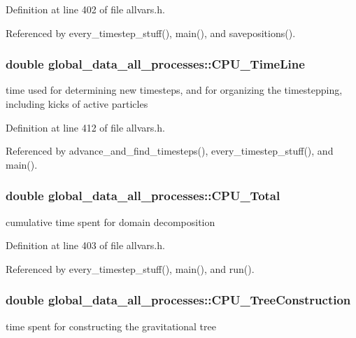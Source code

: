 Definition at line 402 of file allvars.h.



Referenced by every\_\-timestep\_\-stuff(), main(), and savepositions().

\hypertarget{structglobal__data__all__processes_a675f7230ece5f6d88fcc0384a8e1f6c9}{
\subsubsection[{CPU\_\-TimeLine}]{\setlength{\rightskip}{0pt plus 5cm}double {\bf global\_\-data\_\-all\_\-processes::CPU\_\-TimeLine}}}
\label{structglobal__data__all__processes_a675f7230ece5f6d88fcc0384a8e1f6c9}
time used for determining new timesteps, and for organizing the timestepping, including kicks of active particles 

Definition at line 412 of file allvars.h.



Referenced by advance\_\-and\_\-find\_\-timesteps(), every\_\-timestep\_\-stuff(), and main().

\hypertarget{structglobal__data__all__processes_a3d87cd9a94ce540341d4fb713b253c9e}{
\subsubsection[{CPU\_\-Total}]{\setlength{\rightskip}{0pt plus 5cm}double {\bf global\_\-data\_\-all\_\-processes::CPU\_\-Total}}}
\label{structglobal__data__all__processes_a3d87cd9a94ce540341d4fb713b253c9e}
cumulative time spent for domain decomposition 

Definition at line 403 of file allvars.h.



Referenced by every\_\-timestep\_\-stuff(), main(), and run().

\hypertarget{structglobal__data__all__processes_ac9eb650a8550b48eb464b6a0a8629a27}{
\subsubsection[{CPU\_\-TreeConstruction}]{\setlength{\rightskip}{0pt plus 5cm}double {\bf global\_\-data\_\-all\_\-processes::CPU\_\-TreeConstruction}}}
\label{structglobal__data__all__processes_ac9eb650a8550b48eb464b6a0a8629a27}
time spent for constructing the gravitational tree 

